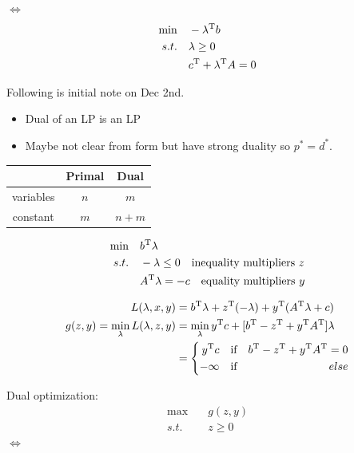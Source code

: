 $\Leftrightarrow$
\begin{align*}
\min\quad &-\lambda^{{\rm T}}b\\
s.t.\quad &\lambda\geq 0\\
&c^{{\rm T}}+\lambda^{{\rm T}}A=0
\end{align*}





Following is initial note on Dec 2nd.

\begin{itemize}
	\item Dual of an LP is an LP
	
	\item Maybe not clear from form but have strong duality so $p^*=d^*$.
\end{itemize}

\begin{center}
\begin{tabular}{|c|c|c|}
	\hline 
	&Primal & Dual\\
	\hline  
	variables & $n$ & $m$\\
	\hline 
	constant&$m$&$n+m$\\
	\hline 
\end{tabular}
\end{center}


\begin{align*}
\min\quad &b^{{\rm T}}\lambda\\
s.t.\quad &-\lambda\leq 0\quad\text{inequality multipliers }z\\
&A^{{\rm T}}\lambda = -c\quad \text{equality multipliers }y
\end{align*}

\begin{align*}
L(\lambda,x,y) &= b^{{\rm T}}\lambda + z^{{\rm T}}(-\lambda)+y^{{\rm T}}(A^{{\rm T}}\lambda + c)\\
g(z,y) = \min_{\lambda}L(\lambda,z,y) &= \min_{\lambda}y^{{\rm T}}c+[b^{{\rm T}}-z^{{\rm T}}+y^{{\rm T}}A^{{\rm T}}]\lambda\\
&=
\left\{
\begin{aligned}
y^{{\rm T}}c &\quad \text{if} &b^{{\rm T}}-z^{{\rm T}}+y^{{\rm T}}A^{{\rm T}}=0 \\
-\infty &\quad \text{if} &else
\end{aligned}
\right.
\end{align*}




Dual optimization:
\begin{align*}
\max\quad &g(z,y)\\
s.t.\quad &z \geq 0
\end{align*}
$\Leftrightarrow$


